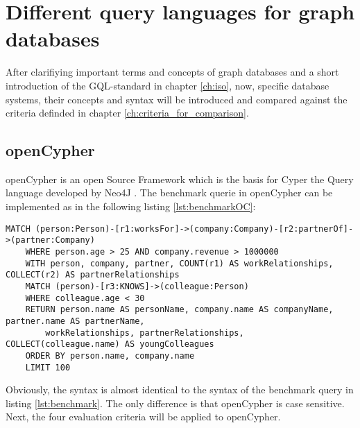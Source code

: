 \chapter{Different query languages for graph databases}
\label{ch:different_query_languages_for_graph_databases}
After clarifiying important terms and concepts of graph databases and a short introduction of the GQL-standard in chapter \ref{ch:iso},
now, specific database systems, their concepts and syntax will be introduced
and compared against the criteria definded in chapter \ref{ch:criteria_for_comparison}.


\section{openCypher}
\label{sec:different_query_languages_for_graph_databases:openCypher}
openCypher \citep{noauthor_opencypher_2024} is an open Source Framework which is the basis for Cyper the Query language
developed by Neo4J \citep{noauthor_neo4j_223}.
The benchmark querie in openCypher can be implemented as in the following listing \ref{lst:benchmarkOC}:
\begin{lstlisting}[caption={Benchmark Query in openCypher}, label={lst:benchmarkOC}] 
	MATCH (person:Person)-[r1:worksFor]->(company:Company)-[r2:partnerOf]->(partner:Company)
	WHERE person.age > 25 AND company.revenue > 1000000
	WITH person, company, partner, COUNT(r1) AS workRelationships, COLLECT(r2) AS partnerRelationships
	MATCH (person)-[r3:KNOWS]->(colleague:Person)
	WHERE colleague.age < 30
	RETURN person.name AS personName, company.name AS companyName, partner.name AS partnerName,
		workRelationships, partnerRelationships, COLLECT(colleague.name) AS youngColleagues
	ORDER BY person.name, company.name
	LIMIT 100
\end{lstlisting}
Obviously, the syntax is almost identical to the syntax of the benchmark query in listing \ref{lst:benchmark}. 
The only difference is that openCypher is case sensitive.
Next, the four evaluation criteria will be applied to openCypher.
